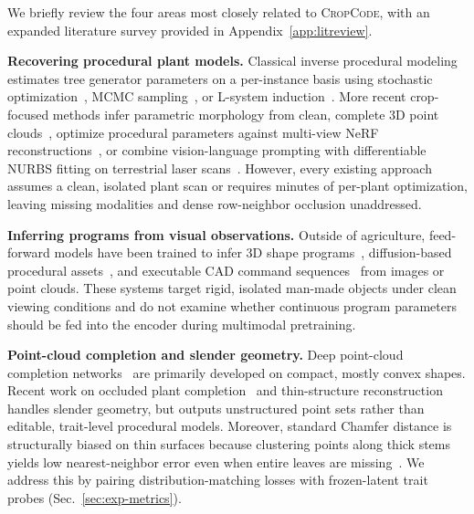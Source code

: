 \documentclass[10pt,twocolumn,letterpaper]{article}
\newcommand{\method}{\textsc{CropCode}}
\begin{document}
We briefly review the four areas most closely related to \method{}, with an expanded literature survey provided in Appendix~\ref{app:litreview}.

\noindent\textbf{Recovering procedural plant models.}
Classical inverse procedural modeling estimates tree generator parameters on a per-instance basis using stochastic optimization~\citep{stava2014ipmtrees}, MCMC sampling~\citep{talton2011metropolis}, or L-system induction~\citep{guo2020ipmlsys,latentlsys2023}. More recent crop-focused methods infer parametric morphology from clean, complete 3D point clouds~\citep{demeter2025,ghrer2025paramplants}, optimize procedural parameters against multi-view NeRF reconstructions~\citep{cropcraft2026}, or combine vision-language prompting with differentiable NURBS fitting on terrestrial laser scans~\citep{hadadi2026vlmmaize,nurbsdiff2022}. However, every existing approach assumes a clean, isolated plant scan or requires minutes of per-plant optimization, leaving missing modalities and dense row-neighbor occlusion unaddressed.

\noindent\textbf{Inferring programs from visual observations.}
Outside of agriculture, feed-forward models have been trained to infer 3D shape programs~\citep{shapeprograms2019}, diffusion-based procedural assets~\citep{zhao2025dipcg}, and executable CAD command sequences~\citep{text2cad2024,kolodiazhnyi2025cadrille} from images or point clouds. These systems target rigid, isolated man-made objects under clean viewing conditions and do not examine whether continuous program parameters should be fed into the encoder during multimodal pretraining.

\noindent\textbf{Point-cloud completion and slender geometry.}
Deep point-cloud completion networks~\citep{yuan2018pcn,yu2021pointr,yu2023adapointr,cai2024einet} are primarily developed on compact, mostly convex shapes. Recent work on occluded plant completion~\citep{lee2026occ} and thin-structure reconstruction~\citep{curvegaussian2025,qi2026rethinking} handles slender geometry, but outputs unstructured point sets rather than editable, trait-level procedural models. Moreover, standard Chamfer distance is structurally biased on thin surfaces because clustering points along thick stems yields low nearest-neighbor error even when entire leaves are missing~\citep{wu2021dcd,song2026structural,lin2023infocd}. We address this by pairing distribution-matching losses with frozen-latent trait probes (Sec.~\ref{sec:exp-metrics}).
\end{document}
